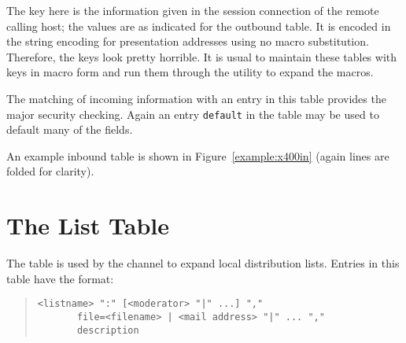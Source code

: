 The key here is the information given in the session connection of the
remote calling host; the values are as indicated for the outbound
table.  It is encoded in the string encoding for presentation
addresses using no macro substitution. Therefore, the keys look pretty
horrible. It is usual to maintain these tables with keys in macro form
and run them through the utility  to expand the macros.

The matching of incoming information with an entry in this table provides the
major security checking.  Again an entry \verb|default| in the table
may be used to default many of the fields.

An example inbound table is shown in Figure~\ref{example:x400in}
(again lines are 
folded for clarity).


\section {The List Table}\label{sect:list}

The  table is used by the  channel to
expand local distribution lists.
Entries in this table have the format:

\begin{quote}\begin{verbatim}
<listname> ":" [<moderator> "|" ...] "," 
       file=<filename> | <mail address> "|" ... "," 
       description
\end{verbatim}\end{quote}


